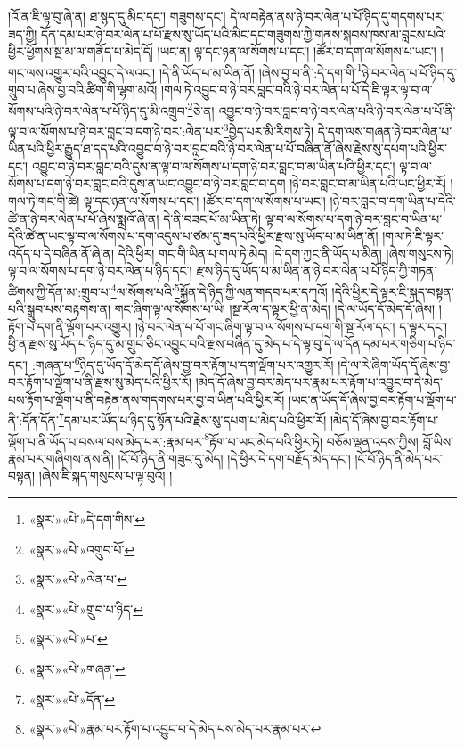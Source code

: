 །འོ་ན་ཇི་ལྟ་བུ་ཞེ་ན། ཐ་སྙད་དུ་མིང་དང་། གཟུགས་དང་། དེ་ལ་བརྟེན་ནས་ཉེ་བར་ལེན་པ་པོ་ཉིད་དུ་གདགས་པར་ཟད་ཀྱི། དོན་དམ་པར་ཉེ་བར་ལེན་པ་པོ་རྫས་སུ་ཡོད་པའི་མིང་དང་གཟུགས་ཀྱི་གནས་སྐབས་ཁས་མ་བླངས་པའི་ཕྱིར་ཕྱོགས་སྔ་མ་ལ་གནོད་པ་མེད་དོ། །ཡང་ན། ལྟ་དང་ཉན་ལ་སོགས་པ་དང་། །ཚོར་བ་དག་ལ་སོགས་པ་ཡང་། །གང་ལས་འགྱུར་བའི་འབྱུང་དེ་ལའང་། །དེ་ནི་ཡོད་པ་མ་ཡིན་ནོ། །ཞེས་བྱ་བ་ནི་:དེ་དག་གི་\footnote{«སྣར་»«པེ་»དེ་དག་གིས་}ཉེ་བར་ལེན་པ་པོ་ཉིད་དུ་གྲུབ་པ་ཞེས་བྱ་བའི་ཚིག་གི་ལྷག་མའོ། །གལ་ཏེ་འབྱུང་བ་ཉེ་བར་བླང་བའི་ཉེ་བར་ལེན་པ་པོ་དེ་ཇི་ལྟར་ལྟ་བ་ལ་སོགས་པའི་ཉེ་བར་ལེན་པ་པོ་ཉིད་དུ་མི་འགྲུབ་\footnote{«སྣར་»«པེ་»འགྲུབ་པོ་}ཅེ་ན། འབྱུང་བ་ཉེ་བར་བླང་བ་ཉེ་བར་ལེན་པའི་ཉེ་བར་ལེན་པ་པོ་ནི་ལྟ་བ་ལ་སོགས་པ་ཉེ་བར་བླང་བ་དག་ཉེ་བར་:ལེན་པར་\footnote{«སྣར་»«པེ་»ལེན་པ་}བྱེད་པར་མི་རིགས་ཏེ། དེ་དག་ལས་གཞན་ཉེ་བར་ལེན་པ་ཡིན་པའི་ཕྱིར་རྒྱུད་ཐ་དད་པའི་འབྱུང་བ་ཉེ་བར་བླང་བའི་ཉེ་བར་ལེན་པ་པོ་བཞིན་ནོ་ཞེས་རྗེས་སུ་དཔག་པའི་ཕྱིར་དང་། འབྱུང་བ་ཉེ་བར་བླང་བའི་དུས་ན་ལྟ་བ་ལ་སོགས་པ་དག་ཉེ་བར་བླང་བ་མ་ཡིན་པའི་ཕྱིར་དང་། ལྟ་བ་ལ་སོགས་པ་དག་ཉེ་བར་བླང་བའི་དུས་ན་ཡང་འབྱུང་བ་ཉེ་བར་བླང་བ་དག །ཉེ་བར་བླང་བ་མ་ཡིན་པའི་ཡང་ཕྱིར་རོ། །གལ་ཏེ་གང་གི་ཚེ། ལྟ་དང་ཉན་ལ་སོགས་པ་དང་། །ཚོར་བ་དག་ལ་སོགས་པ་ཡང་། །ཉེ་བར་བླང་བ་དག་ཡིན་པ་དེའི་ཚེ་ན་ཉེ་བར་ལེན་པ་པོ་ཞེས་སྨྲའོ་ཞེ་ན། དེ་ནི་བཟང་པོ་མ་ཡིན་ཏེ། ལྟ་བ་ལ་སོགས་པ་དག་ཉེ་བར་བླང་བ་ཡིན་པ་དེའི་ཚེ་ན་ཡང་ལྟ་བ་ལ་སོགས་པ་དག་འདུས་པ་ཙམ་དུ་ཟད་པའི་ཕྱིར་རྫས་སུ་ཡོད་པ་མ་ཡིན་ནོ། །གལ་ཏེ་ཇི་ལྟར་འདོད་པ་དེ་བཞིན་ནོ་ཞེ་ན། དེའི་ཕྱིར། གང་གི་ཡིན་པ་གལ་ཏེ་མེད། །དེ་དག་ཀྱང་ནི་ཡོད་པ་མིན། །ཞེས་གསུངས་ཏེ། ལྟ་བ་ལ་སོགས་པ་དག་ཉེ་བར་ལེན་པ་ཉིད་དང་། རྫས་ཉིད་དུ་ཡོད་པ་མ་ཡིན་ན་ཉེ་བར་ལེན་པ་པོ་ཉིད་ཀྱི་གཏན་ཚིགས་ཀྱི་དོན་མ་:གྲུབ་པ་\footnote{«སྣར་»«པེ་»གྲུབ་པ་ཉིད་}ལ་སོགས་པའི་\footnote{«སྣར་»«པེ་»པ་}སྐྱོན་དེ་ཉིད་ཀྱི་ལན་གདབ་པར་དཀའོ། །དེའི་ཕྱིར་དེ་ལྟར་ཇི་སྐད་བསྟན་པའི་སྒྲུབ་པས་བརྟགས་ན། གང་ཞིག་ལྟ་ལ་སོགས་པ་ཡི། །སྔ་རོལ་ད་ལྟར་ཕྱི་ན་མེད། །དེ་ལ་ཡོད་དོ་མེད་དོ་ཞེས། །རྟོག་པ་དག་ནི་ལྡོག་པར་འགྱུར། །ཉེ་བར་ལེན་པ་པོ་གང་ཞིག་ལྟ་བ་ལ་སོགས་པ་དག་གི་སྔ་རོལ་དང་། ད་ལྟར་དང་། ཕྱི་ན་རྫས་སུ་ཡོད་པ་ཉིད་དུ་མ་གྲུབ་ཅིང་འབྱུང་བའི་རྫས་བཞིན་དུ་མེད་པ་དེ་ལྟ་བུ་དེ་ལ་དོན་དམ་པར་གཅིག་པ་ཉིད་དང་། :གཞན་པ་\footnote{«སྣར་»«པེ་»གཞན་}ཉིད་དུ་ཡོད་དོ་མེད་དོ་ཞེས་བྱ་བར་རྟོག་པ་དག་ལྡོག་པར་འགྱུར་རོ། །དེ་ལ་རེ་ཞིག་ཡོད་དོ་ཞེས་བྱ་བར་རྟོག་པ་ལྡོག་པ་ནི་རྫས་སུ་མེད་པའི་ཕྱིར་རོ། །མེད་དོ་ཞེས་བྱ་བར་མེད་པར་རྣམ་པར་རྟོག་པ་འབྱུང་བ་དེ་མེད་པས་རྟོག་པ་ལྡོག་པ་ནི་བརྟེན་ནས་གདགས་པར་བྱ་བ་ཡིན་པའི་ཕྱིར་རོ། །ཡང་ན་ཡོད་དོ་ཞེས་བྱ་བར་རྟོག་པ་ལྡོག་པ་ནི་:དོན་དོན་\footnote{«སྣར་»«པེ་»དོན་}དམ་པར་ཡོད་པ་ཉིད་དུ་སྟོན་པའི་རྗེས་སུ་དཔག་པ་མེད་པའི་ཕྱིར་རོ། །མེད་དོ་ཞེས་བྱ་བར་རྟོག་པ་ལྡོག་པ་ནི་ཡོད་པ་བསལ་བས་མེད་པར་:རྣམ་པར་\footnote{«སྣར་»«པེ་»རྣམ་པར་རྟོག་པ་འབྱུང་བ་དེ་མེད་པས་མེད་པར་རྣམ་པར་}རྟོག་པ་ཡང་མེད་པའི་ཕྱིར་ཏེ། བཅོམ་ལྡན་འདས་ཀྱིས། བློ་ཡིས་རྣམ་པར་གཞིགས་ནས་ནི། །ངོ་བོ་ཉིད་ནི་གཟུང་དུ་མེད། །དེ་ཕྱིར་དེ་དག་བརྗོད་མེད་དང་། །ངོ་བོ་ཉིད་ནི་མེད་པར་བསྟན། །ཞེས་ཇི་སྐད་གསུངས་པ་ལྟ་བུའོ། །
